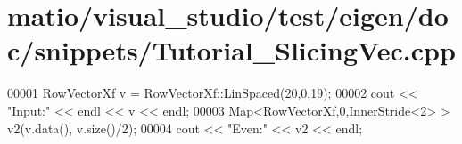 \hypertarget{matio_2visual__studio_2test_2eigen_2doc_2snippets_2_tutorial___slicing_vec_8cpp_source}{}\section{matio/visual\+\_\+studio/test/eigen/doc/snippets/\+Tutorial\+\_\+\+Slicing\+Vec.cpp}
\label{matio_2visual__studio_2test_2eigen_2doc_2snippets_2_tutorial___slicing_vec_8cpp_source}

\begin{DoxyCode}
00001 RowVectorXf v = RowVectorXf::LinSpaced(20,0,19);
00002 cout << \textcolor{stringliteral}{"Input:"} << endl << v << endl;
00003 Map<RowVectorXf,0,InnerStride<2> > v2(v.data(), v.size()/2);
00004 cout << \textcolor{stringliteral}{"Even:"} << v2 << endl;
\end{DoxyCode}
